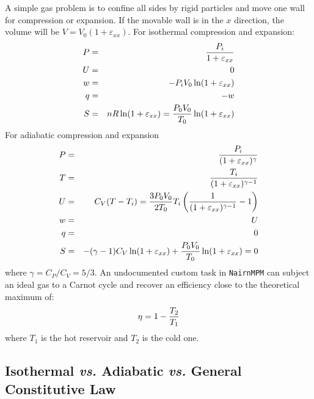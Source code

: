 \documentclass[11pt]{article}
\def\e#1{\varepsilon_{#1}}
\begin{document}
A simple gas problem is to confine all sides by rigid particles and move one wall for compression or expansion. If the movable wall is in the $x$ direction, the volume will be $V = V_0(1+\e{xx})$. For isothermal compression and expansion:
\begin{eqnarray}
    P & = & {P_i\over 1+\e{xx}} \\
    U & = & 0 \\
    w & = & -P_iV_0\ln(1+\e{xx}) \\
    q & = & -w \\
    S & = & nR\ln(1+\e{xx}) = {P_0 V_0\over T_0}\ln(1+\e{xx})
\end{eqnarray}
For adiabatic compression and expansion
\begin{eqnarray}
    P & = & {P_i\over (1+\e{xx})^\gamma} \\
    T & = & {T_i\over (1+\e{xx})^{\gamma-1}} \\
    U & = & C_V(T - T_i) 
               = {3P_0V_0\over 2T_0}T_i\left({1\over (1+\e{xx})^{\gamma-1}}-1\right) \\
    w & = & U \\
    q & = & 0 \\
    S & = & -(\gamma-1)C_V\ln(1+\e{xx}) + {P_0 V_0\over T_0}\ln(1+\e{xx}) = 0
\end{eqnarray}
where $\gamma=C_P/C_V=5/3$. An undocumented custom task in {\tt NairnMPM} can subject an ideal gas to a Carnot cycle and recover an efficiency close to the theoretical maximum of:
\begin{equation}
       \eta = 1 - {T_2\over T_1}
\end{equation}
where $T_1$ is the hot reservoir and $T_2$ is the cold one.

\subsection{Isothermal {\em vs.} Adiabatic {\em vs.} General Constitutive Law}
\end{document}
